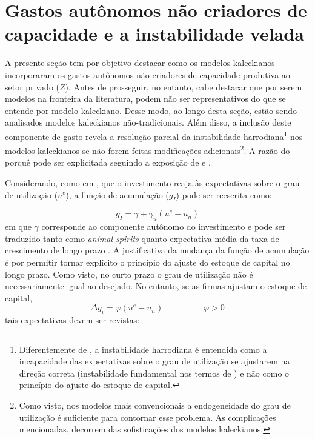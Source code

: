 \section{Gastos autônomos não criadores de capacidade e a instabilidade velada}\label{Literatura}

A presente seção tem por objetivo destacar como os modelos kaleckianos incorporaram os gastos autônomos não criadores de capacidade produtiva ao setor privado ($Z$). Antes de prosseguir, no entanto, cabe destacar que por serem modelos na fronteira da literatura, podem não ser representativos do que se entende por modelo kaleckiano. Desse modo, ao longo desta seção, estão sendo analisados modelos kaleckianos não-tradicionais. Além disso, a inclusão deste componente de gasto revela a resolução parcial da instabilidade harrodiana\footnote{Diferentemente de \textcite{hein_harrodian_2012}, a instabilidade harrodiana é entendida como a incapacidade das expectativas sobre o grau de utilização se ajustarem na direção correta (instabilidade fundamental nos termos de \textcite{serrano_trouble_2017}) e não como o princípio do ajuste do estoque de capital.} nos modelos kaleckianos se não forem feitas modificações adicionais\footnote{Como visto, nos modelos mais convencionais a endogeneidade do grau de utilização é suficiente para contornar esse problema. As complicações mencionadas, decorrem das sofisticações dos modelos kaleckianos.}. A razão do porquê pode ser explicitada seguindo a exposição de \textcite{hein_harrodian_2012} e \textcite{allain_macroeconomic_2014}. 

Considerando, como em \textcite{amadeo_expectations_1987}, que o investimento reaja às expectativas sobre o grau de utilização ($u^e$), a função de acumulação ($g_I$) pode ser reescrita como:

\begin{equation}
\label{Kalecki_Autonomous}
g_I = \gamma + \gamma_u (u^e - u_n)
\end{equation}
em que $\gamma$ corresponde ao componente autônomo do investimento e pode ser traduzido tanto como \textit{animal spirits} quanto expectativa média da taxa de crescimento de longo prazo \cite[p.~4]{allain_macroeconomic_2014}. A justificativa da mudança da função de acumulação é por permitir tornar explícito o princípio do ajuste do estoque de capital no longo prazo. Como visto, no curto prazo o grau de utilização não é necessariamente igual ao desejado. No entanto, se as firmas ajustam o estoque de capital, 
$$
\Delta g_i = \varphi (u^e - u_n) \hspace{2cm} \varphi > 0
$$
tais expectativas devem ser revistas:

